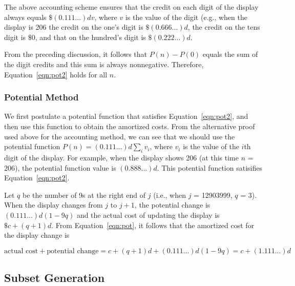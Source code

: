 The above accounting scheme ensures that the credit on each digit of the display
always equals
$\$(0.111...)dv$, 
where
$v$ is the value of the digit (e.g., when the display is
206 the credit on the one's digit is
$\$(0.666...)d$, 
the credit on the tens digit is
$\$0$, and that on the hundred's digit is
$\$(0.222...)d$. 

From the preceding
discussion, it follows that
$P(n) - P(0)$
equals the sum of the digit credits and
this sum is always nonnegative.
Therefore, Equation~\ref{eqn:pot2} holds for all $n$.


\subsubsection*{Potential Method}
We first postulate a potential function that satisfies Equation~\ref{eqn:pot2},
and then use this function to
obtain the amortized costs.
From the alternative proof used above for the accounting method,
we can see that we should use the potential function
$P(n) = (0.111...)d \sum_i v_i$,
where $v_i$ is the value of
the $i$th digit of the display.
For example, when the display shows 206
(at this time $n$ = 206), the
potential function value is $(0.888...)d$.
This potential function satisifies Equation~\ref{eqn:pot2}.

Let $q$ be the number of 9s
at the right end of $j$ (i.e., when $j$
= 12903999, $q$ = 3). When the display changes from
$j$ to $j+1$, the potential change
is $(0.111...)d(1-9q)$ and the actual cost of
updating the display is $\$c + (q+1)d$.
From Equation~\ref{eqn:pot}, it follows that the amortized cost for the display change
is

$$\mbox{actual cost} + \mbox{potential change}
= c + (q+1)d + (0.111...)d(1-9q)
= c + (1.111...)d$$


\subsection{Subset Generation}
